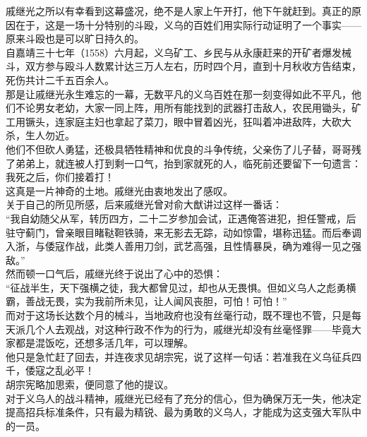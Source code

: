 \begin{multicols}{\theparacolNo}
戚继光之所以有幸看到这幕盛况，绝不是人家上午开打，他下午就赶到。真正的原因在于，这是一场十分特别的斗殴，义乌的百姓们用实际行动证明了一个事实——原来斗殴也是可以旷日持久的。\\

自嘉靖三十七年（1558）六月起，义乌矿工、乡民与从永康赶来的开矿者爆发械斗，双方参与殴斗人数累计达三万人左右，历时四个月，直到十月秋收方告结束，死伤共计二千五百余人。\\

那是让戚继光永生难忘的一幕，无数平凡的义乌百姓在那一刻变得如此不平凡，他们不论男女老幼，大家一同上阵，用所有能找到的武器打击敌人，农民用锄头，矿工用镢头，连家庭主妇也拿起了菜刀，眼中冒着凶光，狂叫着冲进敌阵，大砍大杀，生人勿近。\\

他们不但砍人勇猛，还极具牺牲精神和优良的斗争传统，父亲伤了儿子替，哥哥残了弟弟上，就连被人打到剩一口气，抬到家就死的人，临死前还要留下一句遗言：我死之后，你们接着打！\\

这真是一片神奇的土地。戚继光由衷地发出了感叹。\\

关于自己的所见所感，后来戚继光曾对俞大猷讲过这样一番话：\\

“我自幼随父从军，转历四方，二十二岁参加会试，正遇俺答进犯，担任警戒，后驻守蓟门，曾亲眼目睹鞑靼铁骑，来无影去无踪，动如惊雷，堪称迅猛。而后奉调入浙，与倭寇作战，此类人善用刀剑，武艺高强，且性情暴戾，确为难得一见之强敌。”\\

然而顿一口气后，戚继光终于说出了心中的恐惧：\\

“征战半生，天下强横之徒，我大都曾见过，却也从无畏惧。但如义乌人之彪勇横霸，善战无畏，实为我前所未见，让人闻风丧胆，可怕！可怕！”\\

而对于这场长达数个月的械斗，当地政府也没有丝毫行动，既不理也不管，只是每天派几个人去观战，对这种行政不作为的行为，戚继光却没有丝毫怪罪——毕竟大家都是混饭吃，还想多活几年，可以理解。\\

他只是急忙赶了回去，并连夜求见胡宗宪，说了这样一句话：若准我在义乌征兵四千，倭寇之乱必平！\\

胡宗宪略加思索，便同意了他的提议。\\

对于义乌人的战斗精神，戚继光已经有了充分的信心，但为确保万无一失，他决定提高招兵标准条件，只有最为精锐、最为勇敢的义乌人，才能成为这支强大军队中的一员。\\


\end{multicols}
